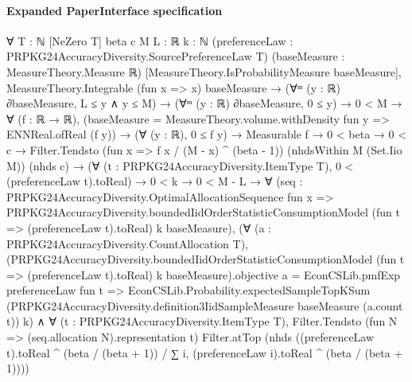 \documentclass[10pt]{article}
\begin{document}
\paragraph{Expanded PaperInterface specification}
\begin{ReviewVerbatim}
∀ {T : ℕ} [NeZero T] {beta c M L : ℝ} {k : ℕ} (preferenceLaw : PRPKG24AccuracyDiversity.SourcePreferenceLaw T)
  (baseMeasure : MeasureTheory.Measure ℝ) [MeasureTheory.IsProbabilityMeasure baseMeasure],
  MeasureTheory.Integrable (fun x => x) baseMeasure →
    (∀ᵐ (y : ℝ) ∂baseMeasure, L ≤ y ∧ y ≤ M) →
      (∀ᵐ (y : ℝ) ∂baseMeasure, 0 ≤ y) →
        0 < M →
          ∀ (f : ℝ → ℝ),
            (baseMeasure = MeasureTheory.volume.withDensity fun y => ENNReal.ofReal (f y)) →
              (∀ (y : ℝ), 0 ≤ f y) →
                Measurable f →
                  0 < beta →
                    0 < c →
                      Filter.Tendsto (fun x => f x / (M - x) ^ (beta - 1)) (nhdsWithin M (Set.Iio M)) (nhds c) →
                        (∀ (t : PRPKG24AccuracyDiversity.ItemType T), 0 < (preferenceLaw t).toReal) →
                          0 < k →
                            0 < M - L →
                              ∀
                                (seq :
                                  PRPKG24AccuracyDiversity.OptimalAllocationSequence fun x =>
                                    PRPKG24AccuracyDiversity.boundedIidOrderStatisticConsumptionModel
                                      (fun t => (preferenceLaw t).toReal) k baseMeasure),
                                (∀ (a : PRPKG24AccuracyDiversity.CountAllocation T),
                                    (PRPKG24AccuracyDiversity.boundedIidOrderStatisticConsumptionModel
                                            (fun t => (preferenceLaw t).toReal) k baseMeasure).objective
                                        a =
                                      EconCSLib.pmfExp preferenceLaw fun t =>
                                        EconCSLib.Probability.expectedSampleTopKSum
                                          (PRPKG24AccuracyDiversity.definition3IidSampleMeasure baseMeasure (a.count t))
                                          k) ∧
                                  ∀ (t : PRPKG24AccuracyDiversity.ItemType T),
                                    Filter.Tendsto (fun N => (seq.allocation N).representation t) Filter.atTop
                                      (nhds
                                        ((preferenceLaw t).toReal ^ (beta / (beta + 1)) /
                                          ∑ i, (preferenceLaw i).toReal ^ (beta / (beta + 1))))
\end{ReviewVerbatim}
\end{document}
